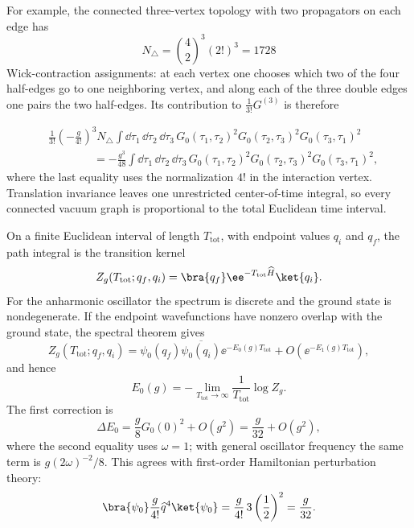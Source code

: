 For example, the connected three-vertex topology with two propagators on each
edge has
\[
  N_\triangle=\binom{4}{2}^3(2!)^3=1728
\]
Wick-contraction assignments: at each vertex one chooses which two of the four
half-edges go to one neighboring vertex, and along each of the three double
edges one pairs the two half-edges.  Its contribution to
\(\frac{1}{3!}G^{(3)}\) is therefore
\begin{center}
\end{center}
\[
\begin{aligned}
  &\frac{1}{3!}
  \left(-\frac{g}{4!}\right)^3
  N_\triangle
  \int\dd\tau_1\,\dd\tau_2\,\dd\tau_3\,
  G_0(\tau_1,\tau_2)^2
  G_0(\tau_2,\tau_3)^2
  G_0(\tau_3,\tau_1)^2                                      \\
  &\hspace{4em}
  =
  -\frac{g^3}{48}\int\dd\tau_1\,\dd\tau_2\,\dd\tau_3\,
  G_0(\tau_1,\tau_2)^2
  G_0(\tau_2,\tau_3)^2
  G_0(\tau_3,\tau_1)^2,
\end{aligned}
\]
where the last equality uses the normalization \(4!\) in the interaction
vertex.  Translation invariance leaves one unrestricted
center-of-time integral, so every connected vacuum graph is proportional to
the total Euclidean time interval.

On a finite Euclidean interval of length \(T_{\mathrm{tot}}\), with endpoint
values \(q_i\) and \(q_f\), the path integral is the transition kernel
\[
  Z_g(T_{\mathrm{tot}};q_f,q_i)
  =
  \bra{q_f}\ee^{-T_{\mathrm{tot}}\widehat H}\ket{q_i}.
\]
For the anharmonic oscillator the spectrum is discrete and the ground state is
nondegenerate.  If the endpoint wavefunctions have nonzero overlap with the
ground state, the spectral theorem gives
\[
  Z_g(T_{\mathrm{tot}};q_f,q_i)
  =
  \psi_0(q_f)\overline{\psi_0(q_i)}
  \ee^{-E_0(g)T_{\mathrm{tot}}}
  +O(\ee^{-E_1(g)T_{\mathrm{tot}}}),
\]
and hence
\[
  E_0(g)
  =
  -\lim_{T_{\mathrm{tot}}\to\infty}
  \frac{1}{T_{\mathrm{tot}}}\log Z_g.
\]
The first correction is
\[
  \Delta E_0
  =
  \frac{g}{8}G_0(0)^2+O(g^2)
  =
  \frac{g}{32}+O(g^2),
\]
where the second equality uses \(\omega=1\); with general oscillator frequency
the same term is \(g(2\omega)^{-2}/8\).
This agrees with first-order Hamiltonian perturbation theory:
\[
  \bra{\psi_0}\frac{g}{4!}\widehat q^4\ket{\psi_0}
  =
  \frac{g}{4!}\,3\left(\frac12\right)^2
  =
  \frac{g}{32}.
\]

